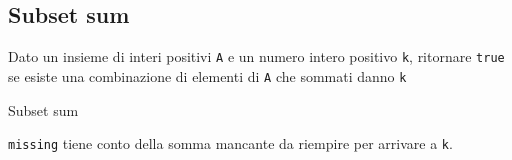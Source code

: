 \subsection{Subset sum}\label{subset sum}
Dato un insieme di interi positivi \verb|A| e un numero intero positivo \verb|k|, ritornare \verb|true| se esiste una combinazione di elementi di \verb|A| che sommati danno \verb|k|
\vskip3mm
\begin{algoritmo}{Subset sum}
	\begin{algorithm}[H]
		\caption{Recursive Subset Sum with Solution Printing}

	\end{algorithm}
\end{algoritmo}
\vskip3mm
\verb|missing| tiene conto della somma mancante da riempire per arrivare a \verb|k|.
